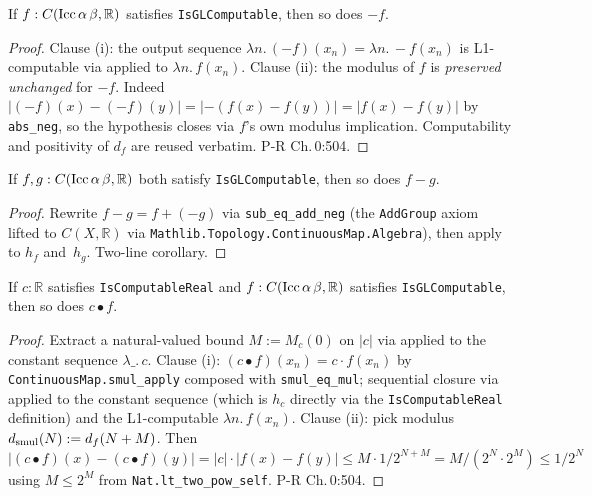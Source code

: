 \begin{lemma}
  \label{lem:l2_neg_gl}
  \leanok
  If $f : C(\textnormal{Icc}\,\alpha\,\beta, \mathbb{R})$ satisfies \texttt{IsGLComputable}, then so does $-f$.
\end{lemma}
\begin{proof}\leanok
  Clause (i): the output sequence $\lambda n.\,(-f)(x_n) = \lambda n.\,-f(x_n)$ is L1-computable via  applied to $\lambda n.\,f(x_n)$. Clause (ii): the modulus of $f$ is \emph{preserved unchanged} for $-f$. Indeed $|(-f)(x) - (-f)(y)| = |-(f(x) - f(y))| = |f(x) - f(y)|$ by \texttt{abs\_neg}, so the hypothesis closes via $f$'s own modulus implication. Computability and positivity of $d_f$ are reused verbatim. P-R Ch.\,0:504.
\end{proof}

\begin{lemma}
  \label{lem:l2_sub_gl}
  \leanok
  If $f, g : C(\textnormal{Icc}\,\alpha\,\beta, \mathbb{R})$ both satisfy \texttt{IsGLComputable}, then so does $f - g$.
\end{lemma}
\begin{proof}\leanok
  Rewrite $f - g = f + (-g)$ via \texttt{sub\_eq\_add\_neg} (the \texttt{AddGroup} axiom lifted to $C(X, \mathbb{R})$ via \texttt{Mathlib.Topology.ContinuousMap.Algebra}), then apply  to $h_f$ and \,$h_g$. Two-line corollary.
\end{proof}

\begin{lemma}
  \label{lem:l2_smul_gl}
  \leanok
  If $c : \mathbb{R}$ satisfies \texttt{IsComputableReal} and $f : C(\textnormal{Icc}\,\alpha\,\beta, \mathbb{R})$ satisfies \texttt{IsGLComputable}, then so does $c \bullet f$.
\end{lemma}
\begin{proof}\leanok
  Extract a natural-valued bound $M := M_c(0)$ on $|c|$ via  applied to the constant sequence $\lambda \_.\,c$. Clause (i): $(c \bullet f)(x_n) = c \cdot f(x_n)$ by \texttt{ContinuousMap.smul\_apply} composed with \texttt{smul\_eq\_mul}; sequential closure via  applied to the constant sequence (which is $h_c$ directly via the \texttt{IsComputableReal} definition) and the L1-computable $\lambda n.\,f(x_n)$. Clause (ii): pick modulus $d_{\textnormal{smul}}(N) := d_f(N + M)$. Then $|(c \bullet f)(x) - (c \bullet f)(y)| = |c| \cdot |f(x) - f(y)| \le M \cdot 1/2^{N+M} = M / (2^N \cdot 2^M) \le 1/2^N$ using $M \le 2^M$ from \texttt{Nat.lt\_two\_pow\_self}. P-R Ch.\,0:504.
\end{proof}

